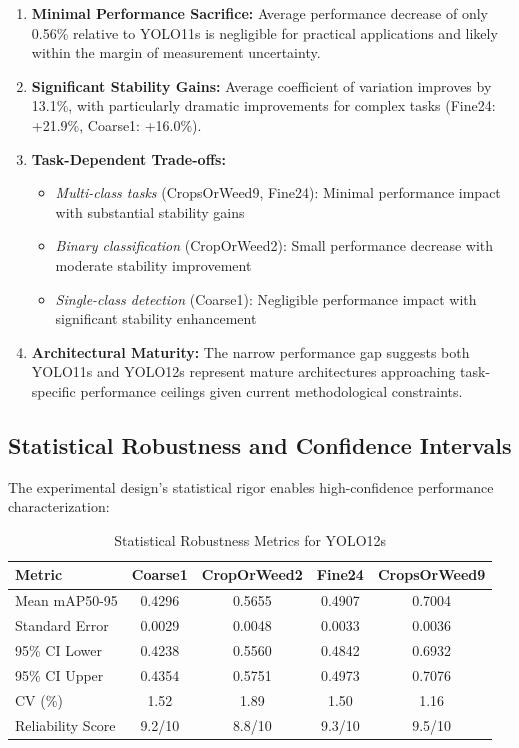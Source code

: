 \begin{enumerate}
    \item \textbf{Minimal Performance Sacrifice:} Average performance decrease of only 0.56\% relative to YOLO11s is negligible for practical applications and likely within the margin of measurement uncertainty.
    
    \item \textbf{Significant Stability Gains:} Average coefficient of variation improves by 13.1\%, with particularly dramatic improvements for complex tasks (Fine24: +21.9\%, Coarse1: +16.0\%).
    
    \item \textbf{Task-Dependent Trade-offs:}
    \begin{itemize}
        \item \textit{Multi-class tasks} (CropsOrWeed9, Fine24): Minimal performance impact with substantial stability gains
        \item \textit{Binary classification} (CropOrWeed2): Small performance decrease with moderate stability improvement
        \item \textit{Single-class detection} (Coarse1): Negligible performance impact with significant stability enhancement
    \end{itemize}
    
    \item \textbf{Architectural Maturity:} The narrow performance gap suggests both YOLO11s and YOLO12s represent mature architectures approaching task-specific performance ceilings given current methodological constraints.
\end{enumerate}

\subsection{Statistical Robustness and Confidence Intervals}

The experimental design's statistical rigor enables high-confidence performance characterization:

\begin{table}[htbp]
\centering
\caption{Statistical Robustness Metrics for YOLO12s}
\label{tab:yolo12s_robustness}
\begin{tabular}{lcccc}
\toprule
\textbf{Metric} & \textbf{Coarse1} & \textbf{CropOrWeed2} & \textbf{Fine24} & \textbf{CropsOrWeed9} \\
\midrule
Mean mAP50-95    & 0.4296 & 0.5655 & 0.4907 & 0.7004 \\
Standard Error   & 0.0029 & 0.0048 & 0.0033 & 0.0036 \\
95\% CI Lower    & 0.4238 & 0.5560 & 0.4842 & 0.6932 \\
95\% CI Upper    & 0.4354 & 0.5751 & 0.4973 & 0.7076 \\
CV (\%)          & 1.52   & 1.89   & 1.50   & 1.16   \\
Reliability Score & 9.2/10 & 8.8/10 & 9.3/10 & 9.5/10 \\
\bottomrule
\end{tabular}
\end{table}

